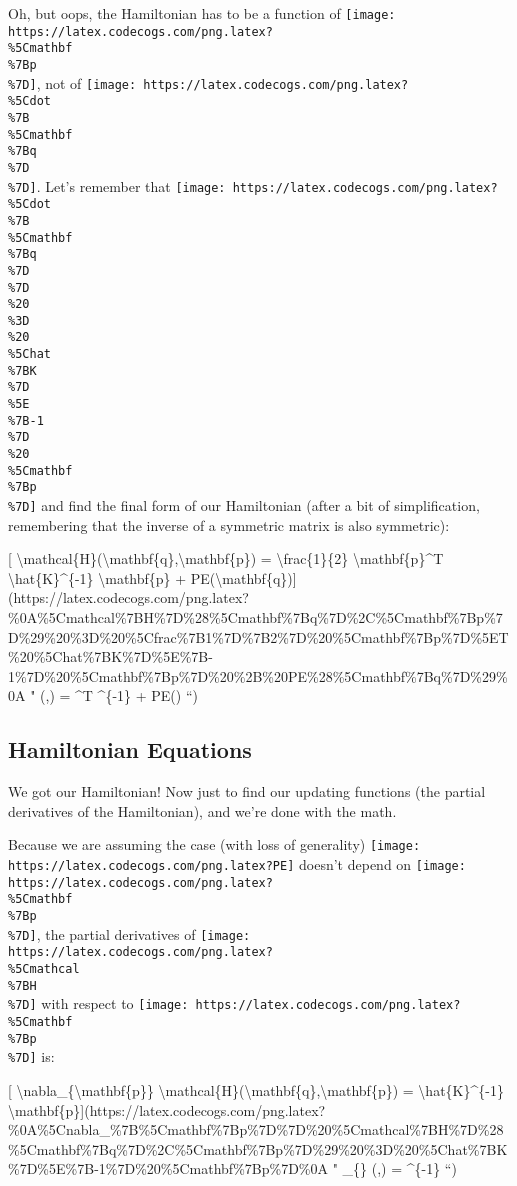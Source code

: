 \documentclass[]{article}
\begin{document}
Oh, but oops, the Hamiltonian has to be a function of
\texttt{[image: https://latex.codecogs.com/png.latex?\\\%5Cmathbf\\\%7Bp\\\%7D]}, not
of
\texttt{[image: https://latex.codecogs.com/png.latex?\\\%5Cdot\\\%7B\\\%5Cmathbf\\\%7Bq\\\%7D\\\%7D]}.
Let's remember that
\texttt{[image: https://latex.codecogs.com/png.latex?\\\%5Cdot\\\%7B\\\%5Cmathbf\\\%7Bq\\\%7D\\\%7D\\\%20\\\%3D\\\%20\\\%5Chat\\\%7BK\\\%7D\\\%5E\\\%7B-1\\\%7D\\\%20\\\%5Cmathbf\\\%7Bp\\\%7D]}
and find the final form of our Hamiltonian (after a bit of simplification,
remembering that the inverse of a symmetric matrix is also symmetric):

{[}
\textbackslash{}mathcal\{H\}(\textbackslash{}mathbf\{q\},\textbackslash{}mathbf\{p\})
= \textbackslash{}frac\{1\}\{2\} \textbackslash{}mathbf\{p\}\^{}T
\textbackslash{}hat\{K\}\^{}\{-1\} \textbackslash{}mathbf\{p\} +
PE(\textbackslash{}mathbf\{q\}){]}(https://latex.codecogs.com/png.latex?\%0A\%5Cmathcal\%7BH\%7D\%28\%5Cmathbf\%7Bq\%7D\%2C\%5Cmathbf\%7Bp\%7D\%29\%20\%3D\%20\%5Cfrac\%7B1\%7D\%7B2\%7D\%20\%5Cmathbf\%7Bp\%7D\%5ET\%20\%5Chat\%7BK\%7D\%5E\%7B-1\%7D\%20\%5Cmathbf\%7Bp\%7D\%20\%2B\%20PE\%28\%5Cmathbf\%7Bq\%7D\%29\%0A
" (,) =  \^{}T
\^{}\{-1\}  + PE() ``)

\subsection{Hamiltonian Equations}\label{hamiltonian-equations}

We got our Hamiltonian! Now just to find our updating functions (the partial
derivatives of the Hamiltonian), and we're done with the math.

Because we are assuming the case (with loss of generality)
\texttt{[image: https://latex.codecogs.com/png.latex?PE]} doesn't depend on
\texttt{[image: https://latex.codecogs.com/png.latex?\\\%5Cmathbf\\\%7Bp\\\%7D]}, the
partial derivatives of
\texttt{[image: https://latex.codecogs.com/png.latex?\\\%5Cmathcal\\\%7BH\\\%7D]} with
respect to
\texttt{[image: https://latex.codecogs.com/png.latex?\\\%5Cmathbf\\\%7Bp\\\%7D]} is:

{[} \textbackslash{}nabla\_\{\textbackslash{}mathbf\{p\}\}
\textbackslash{}mathcal\{H\}(\textbackslash{}mathbf\{q\},\textbackslash{}mathbf\{p\})
= \textbackslash{}hat\{K\}\^{}\{-1\}
\textbackslash{}mathbf\{p\}{]}(https://latex.codecogs.com/png.latex?\%0A\%5Cnabla\_\%7B\%5Cmathbf\%7Bp\%7D\%7D\%20\%5Cmathcal\%7BH\%7D\%28\%5Cmathbf\%7Bq\%7D\%2C\%5Cmathbf\%7Bp\%7D\%29\%20\%3D\%20\%5Chat\%7BK\%7D\%5E\%7B-1\%7D\%20\%5Cmathbf\%7Bp\%7D\%0A
" \nabla\_\{\} (,) = \^{}\{-1\}
 ``)
\end{document}
